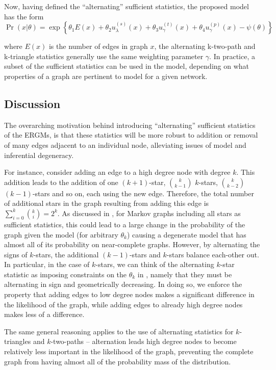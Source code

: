 Now, having defined the ``alternating'' sufficient statistics, the proposed model has the form
\begin{equation}
\label{eq:ergm_alt_stats}
\Pr(x | \theta) = \exp\left\{\theta_1 E(x) + \theta_2 u_\lambda^{(s)}(x) + \theta_3 u_\gamma^{(t)}(x)  + \theta_4 u_\gamma^{(p)}(x) - \psi(\theta)  \right\}
\end{equation}

where $E(x)$ is the number of edges in graph $x$, the alternating k-two-path and k-triangle statistics generally use the same weighting parameter $\gamma$. In practice, a subset of the sufficient statistics can be used in the model, depending on what properties of a graph are pertinent to model for a given network. 

\subsection{Discussion}

The overarching motivation behind introducing ``alternating'' sufficient statistics of the ERGMs, is that these statistics will be more robust to addition or removal of many edges adjacent to an individual node, alleviating issues of model and inferential degeneracy. 

For instance, consider adding an edge to a high degree node with degree $k$. This addition leads to the addition of one $(k+1)$-star, $\binom{k}{k-1}$ $k$-stars, $\binom{k}{k-2}$ $(k-1)$-stars and so on, each using the new edge. Therefore, the total number of additional stars in the graph resulting from adding this edge is $\sum_{i = 0}^{k} \binom{k}{i} = 2^k$. As discussed in , for Markov graphs including all stars as sufficient statistics, this could lead to a large change in the probability of the graph given the model (for arbitrary $\theta_k$) causing a degenerate model that has almost all of its probability on near-complete graphs. However, by alternating the signs of $k$-stars, the additional $(k-1)$-stars and $k$-stars balance each-other out. In particular, in the case of $k$-stars, we can think of the alternating $k$-star statistic as imposing constraints on the $\theta_k$ in , namely that they must be alternating in sign and geometrically decreasing. In doing so, we enforce the property that adding edges to low degree nodes makes a significant difference in the likelihood of the graph, while adding edges to already high degree nodes makes less of a difference. 

 The same general reasoning applies to the use of alternating statistics for $k$-triangles and $k$-two-paths -- alternation leads high degree nodes to become relatively less important in the likelihood of the graph, preventing the complete graph from having almost all of the probability mass of the distribution. 
 
